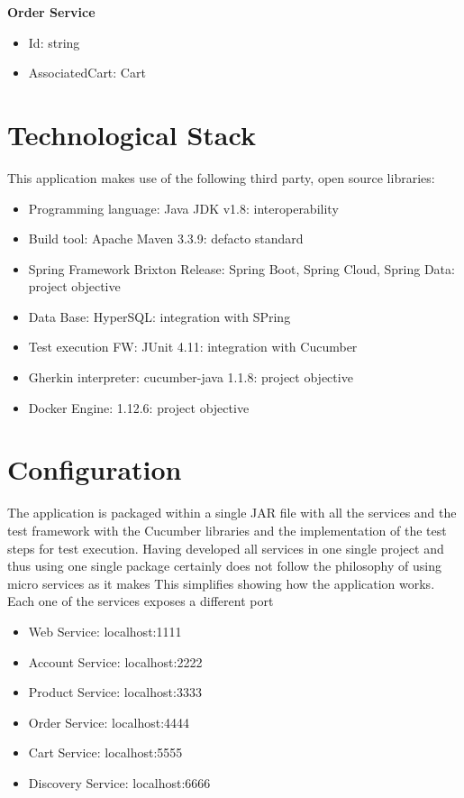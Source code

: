 \textbf{Order Service}
\begin{itemize}
\item Id: string
\item AssociatedCart: Cart\\
\end{itemize}


\section{Technological Stack}
This application makes use of the following third party, open source libraries:

\begin{itemize}
\item Programming language: Java JDK v1.8: interoperability
\item Build tool: Apache Maven 3.3.9: defacto standard
\item Spring Framework Brixton Release: Spring Boot, Spring Cloud, Spring Data: project objective
\item Data Base: HyperSQL: integration with SPring
\item Test execution FW: JUnit 4.11: integration with Cucumber
\item Gherkin interpreter: cucumber-java 1.1.8: project objective
\item Docker Engine: 1.12.6: project objective
\end{itemize}


\section{Configuration}
The application is packaged within a single JAR file with all the services and the test framework with the Cucumber libraries and the implementation of the test steps for test execution. Having developed all services in one single project and thus using one single package certainly does not follow the philosophy of using micro services as it makes This simplifies showing how the application works. Each one of the services exposes a different port

\begin{itemize}
\item Web Service: 				localhost:1111
\item Account Service: 		localhost:2222
\item Product Service: 		localhost:3333
\item Order Service: 			localhost:4444
\item Cart Service: 			localhost:5555
\item Discovery Service: 	localhost:6666
\end{itemize}


